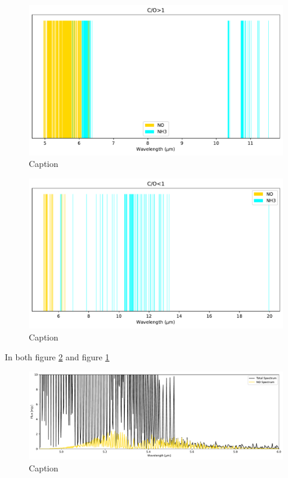 \documentclass[twoside, single, authoryear, semicolon]{lion-msc}
\newcommand{\4}{$_4$}
\newcommand{\3}{$_3$}
\newcommand{\2}{$_2$}
\begin{document}
\begin{figure}[!ht]
    \centering
    \includegraphics[width=\linewidth]{Figures/ClassificationCOgt0.pdf}
    \caption{Caption}
    \label{fig:class>1}
\end{figure}

\begin{figure}[!ht]
    \centering
    \includegraphics[width=\linewidth]{Figures/ClassificationCOst0.pdf}
    \caption{Caption}
    \label{fig:class<1}
\end{figure}

In both figure \ref{fig:class<1} and figure \ref{fig:class>1}

\begin{figure}[!ht]
    \centering
    \includegraphics[width=\linewidth]{Figures/NO_region.pdf}
    \caption{Caption}
    \label{fig:enter-label}
\end{figure}
\end{document}

